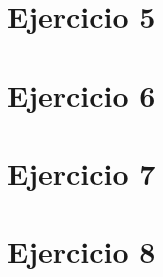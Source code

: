 \documentclass[a4paper]{article}
\begin{document}
\section{Ejercicio 5}

\vspace*{0.3cm}

\vspace*{0.6cm}

\section{Ejercicio 6}

\vspace*{0.3cm}

\vspace*{0.6cm}

\section{Ejercicio 7}

\vspace*{0.3cm}

\vspace*{0.6cm}

\section{Ejercicio 8}

\vspace*{0.3cm}

\vspace*{0.6cm}
\end{document}
